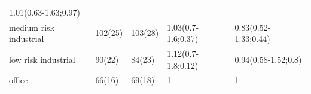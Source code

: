 \documentclass[
]{article}
\begin{document}
\begin{longtable}[]{@{}lllll@{}}
\begin{minipage}[t]{0.23\columnwidth}
1.01(0.63-1.63;0.97)\strut
\end{minipage}\tabularnewline
\begin{minipage}[t]{0.20\columnwidth}\raggedright
medium risk industrial\strut
\end{minipage} & \begin{minipage}[t]{0.08\columnwidth}\raggedright
102(25)\strut
\end{minipage} & \begin{minipage}[t]{0.10\columnwidth}\raggedright
103(28)\strut
\end{minipage} & \begin{minipage}[t]{0.24\columnwidth}\raggedright
1.03(0.7-1.6;0.37)\strut
\end{minipage} & \begin{minipage}[t]{0.23\columnwidth}\raggedright
0.83(0.52-1.33;0.44)\strut
\end{minipage}\tabularnewline
\begin{minipage}[t]{0.20\columnwidth}\raggedright
low risk industrial\strut
\end{minipage} & \begin{minipage}[t]{0.08\columnwidth}\raggedright
90(22)\strut
\end{minipage} & \begin{minipage}[t]{0.10\columnwidth}\raggedright
84(23)\strut
\end{minipage} & \begin{minipage}[t]{0.24\columnwidth}\raggedright
1.12(0.7-1.8;0.12)\strut
\end{minipage} & \begin{minipage}[t]{0.23\columnwidth}\raggedright
0.94(0.58-1.52;0.8)\strut
\end{minipage}\tabularnewline
\begin{minipage}[t]{0.20\columnwidth}\raggedright
office\strut
\end{minipage} & \begin{minipage}[t]{0.08\columnwidth}\raggedright
66(16)\strut
\end{minipage} & \begin{minipage}[t]{0.10\columnwidth}\raggedright
69(18)\strut
\end{minipage} & \begin{minipage}[t]{0.24\columnwidth}\raggedright
1\strut
\end{minipage} & \begin{minipage}[t]{0.23\columnwidth}\raggedright
1\strut
\end{minipage}\tabularnewline
\bottomrule
\end{longtable}
\end{document}
